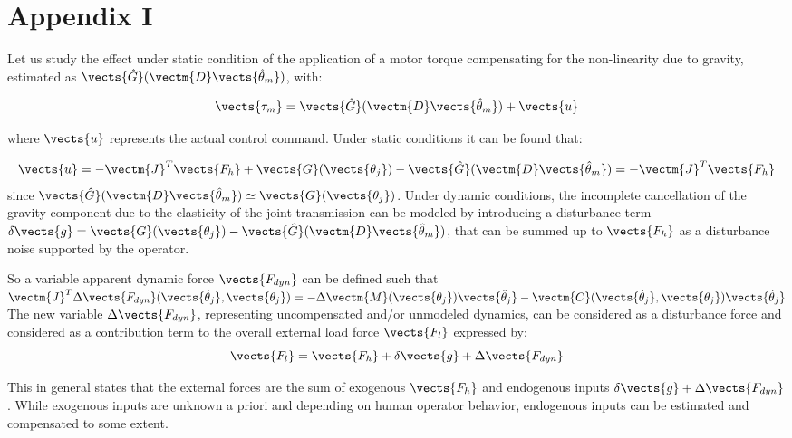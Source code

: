 
\section{Appendix I}




Let us study the effect under static condition of the application of a motor torque compensating for the non-linearity due to gravity, estimated as 
$\vects{\hat{G}}(\vectm{D} \vects{\hat{\theta}_m})$, with:

\begin{equation}
\vects{\tau_m}=  \vects{\hat{G}}(\vectm{D} \vects{\hat{\theta}_m})+\vects{u}
\label{eq:inputForce}
\end{equation}

where  $\vects{u}$ represents the actual control command.
Under static conditions it can be found that:

\begin{equation}
\vects{u}=-  \vectm{J}^T \vects{F_h} +\vects{G}( \vects{\theta_j}) - \vects{\hat{G}}(\vectm{D} \vects{\hat{\theta}_m})= - \vectm{J}^T \vects{F_h}
\label{eq:inputInStaticCondition}
\end{equation}
since $\vects{\hat{G}}(\vectm{D} \vects{\hat{\theta}_m}) \simeq \vects{G}( \vects{\theta_j})$. Under dynamic conditions, the incomplete cancellation of the gravity component due to the elasticity of the joint transmission can be modeled by introducing a disturbance term $\delta \vects{g}=\vects{G}( \vects{\theta_j}) - \vects{\hat{G}}(\vectm{D} \vects{\hat{\theta}_m})$, that can be summed up 
to $\vects{F_h}$ as a disturbance noise supported by the operator.


So a variable apparent dynamic force $\vects{F_{dyn}}$ can be defined   such that
$\vectm{J}^T \Delta \vects{ F_{dyn}}( \vects{\dot{\theta}_j}, \vects{\theta_j})  =- \Delta \vectm{M} ( \vects{\theta_j}) \vects{\ddot{\theta}_j} - \vectm{C}( \vects{\dot{\theta}_j}, \vects{\theta_j})  \vects{\dot{\theta}_j}  $
The new variable $\Delta \vects{F_{dyn}}$,  representing uncompensated and/or unmodeled dynamics, can be considered as a disturbance force and considered as a contribution term to the overall external load  force  $\vects{F_l}$ expressed by:
\begin{equation}
\vects{F_l}= \vects{F_h} + \delta \vects{g}  + \Delta \vects{F_{dyn}}
\label{eq:extraForces}
\end{equation}



This in general states that the external forces are the sum of exogenous $\vects{F_h} $ and endogenous inputs  $ \delta \vects{g} + \Delta \vects{F_{dyn}}$ . While exogenous inputs are unknown a priori and depending on human operator behavior, endogenous inputs can be estimated and compensated to some extent.

